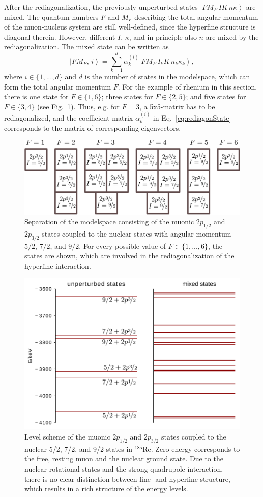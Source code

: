 After the rediagonalization, the previously unperturbed states $\left|FM_F\,IK\,n\kappa\right>$ are mixed. The quantum numbers $F$ and $M_F$ describing the total angular momentum of the muon-nucleus system are still well-defined, since the hyperfine structure is diagonal therein. However, different $I$, $\kappa$, and in principle also $n$ are mixed by the rediagonalization. The mixed state can be written as
\begin{equation}
\label{eq:rediagonState}
\left|FM_F,\,i\right> = \sum_{k=1}^d \alpha^{(i)}_k \left| FM_F\,I_kK\,n_k\kappa_k\right>,
\end{equation}
where $i\in \{1,...,d\}$ and $d$ is the number of states in the modelspace, which can form the total angular momentum $F$. For the example of rhenium in this section, there is one state for $F\in \{1,6\}$; three states for $F\in\{2,5\}$; and five states for $F\in\{3,4\}$ (see Fig.~\ref{fig:blockRe}). Thus, e.g. for $F=3$, a 5x5-matrix has to be rediagonalized, and the coefficient-matrix $\alpha^{(i)}_k$ in Eq.~\eqref{eq:rediagonState} corresponds to the matrix of corresponding eigenvectors.
%
\begin{figure}%
\centering
\includegraphics[width=0.91\linewidth]{pics/blocksRe.pdf}%
\caption{Separation of the modelspace consisting of the muonic $2p_{1/2}$ and $2p_{3/2}$ states coupled to the nuclear states with angular momentum $5/2$, $7/2$, and $9/2$. For every possible value of $F\in \{1,...,6\}$, the states are shown, which are involved in the rediagonalization of the hyperfine interaction.}%
\label{fig:blockRe}%
\end{figure}
%
%
\begin{figure}%
\centering
\includegraphics[width=0.75\linewidth]{pics/quad2.pdf}%
\caption{Level scheme of the muonic $2p_{1/2}$ and $2p_{3/2}$ states coupled to the nuclear 5/2, 7/2, and 9/2  states in $^{185}$Re. Zero energy corresponds to the free, resting muon and the nuclear ground state. Due to the nuclear rotational states and the strong quadrupole interaction, there is no clear distinction between fine- and hyperfine structure, which results in a rich structure of the energy levels.}%
\label{fig:quad2}%
\end{figure}
